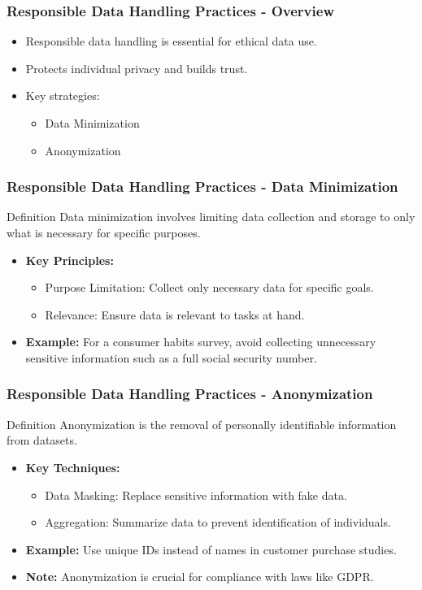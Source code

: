 \documentclass[aspectratio=169]{beamer}
\begin{document}
\begin{frame}[fragile]
    \frametitle{Responsible Data Handling Practices - Overview}
    \begin{itemize}
        \item Responsible data handling is essential for ethical data use.
        \item Protects individual privacy and builds trust.
        \item Key strategies:
        \begin{itemize}
            \item Data Minimization
            \item Anonymization
        \end{itemize}
    \end{itemize}
\end{frame}

\begin{frame}[fragile]
    \frametitle{Responsible Data Handling Practices - Data Minimization}
    \begin{block}{Definition}
        Data minimization involves limiting data collection and storage to only what is necessary for specific purposes.
    \end{block}
    \begin{itemize}
        \item \textbf{Key Principles:}
        \begin{itemize}
            \item Purpose Limitation: Collect only necessary data for specific goals.
            \item Relevance: Ensure data is relevant to tasks at hand.
        \end{itemize}
        \item \textbf{Example:} For a consumer habits survey, avoid collecting unnecessary sensitive information such as a full social security number.
    \end{itemize}
\end{frame}

\begin{frame}[fragile]
    \frametitle{Responsible Data Handling Practices - Anonymization}
    \begin{block}{Definition}
        Anonymization is the removal of personally identifiable information from datasets.
    \end{block}
    \begin{itemize}
        \item \textbf{Key Techniques:}
        \begin{itemize}
            \item Data Masking: Replace sensitive information with fake data.
            \item Aggregation: Summarize data to prevent identification of individuals.
        \end{itemize}
        \item \textbf{Example:} Use unique IDs instead of names in customer purchase studies.
        \item \textbf{Note:} Anonymization is crucial for compliance with laws like GDPR.
    \end{itemize}
\end{frame}
\end{document}
